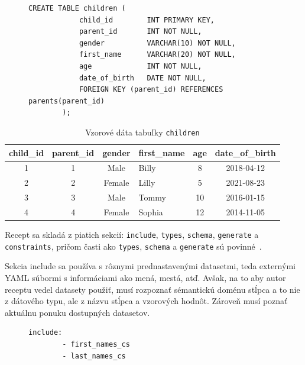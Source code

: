 \begin{figure}[H]

    \centering
    \begin{lstlisting}[caption={Definícia tabuľky \texttt{children}}, label={lst:children}]
        CREATE TABLE children (
            child_id        INT PRIMARY KEY,
            parent_id       INT NOT NULL,
            gender          VARCHAR(10) NOT NULL,
            first_name      VARCHAR(20) NOT NULL,
            age             INT NOT NULL,
            date_of_birth   DATE NOT NULL,
            FOREIGN KEY (parent_id) REFERENCES parents(parent_id)
        );
    \end{lstlisting}

\end{figure}

\begin{table}[H]
        
    \begin{tabular}{ccclcc}
         \toprule
         \textbf{child\_id} & \textbf{parent\_id} & \textbf{gender} & \textbf{first\_name} & \textbf{age} & \textbf{date\_of\_birth} \\
         \midrule
         1 & 1 & Male   & Billy  & 8    & 2018-04-12 \\
         2 & 2 & Female & Lilly  & 5    & 2021-08-23 \\
         3 & 3 & Male   & Tommy  & 10   & 2016-01-15 \\
         4 & 4 & Female & Sophia & 12   & 2014-11-05 \\
         \bottomrule
    \end{tabular}
    \caption{Vzorové dáta tabuľky \texttt{children}}
    \label{table:sample_children}
    
\end{table}
    
Recept sa skladá z piatich sekcií: \texttt{include}, \texttt{types}, \texttt{schema}, \texttt{generate} a \texttt{constraints}, pričom časti ako \texttt{types}, \texttt{schema} a \texttt{generate}  sú povinné~\cite{Vlach2020}.


Sekcia include sa používa s rôznymi prednastavenými datasetmi, teda externými YAML súbormi s informáciami ako mená, mestá, atď. Avšak, na to aby autor receptu vedel datasety použiť, musí rozpoznať sémantickú doménu stĺpca a to nie z dátového typu, ale z názvu stĺpca a vzorových hodnôt. Zároveň musí poznať aktuálnu ponuku dostupných datasetov. 

\begin{figure}[H]
    \centering
  \begin{lstlisting}[caption={Include sekcia pre ukážkovú databázu}, label={lst:recipe-include}, frame=single, linewidth=0.65\textwidth, xleftmargin=0.28\textwidth]
    include:
        - first_names_cs
        - last_names_cs
\end{lstlisting}

\end{figure}

